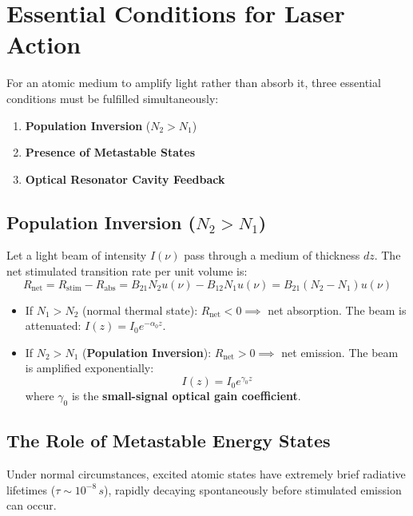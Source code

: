 \section{Essential Conditions for Laser Action}

For an atomic medium to amplify light rather than absorb it, three essential conditions must be fulfilled simultaneously:
\begin{enumerate}
    \item \textbf{Population Inversion} ($N_2 > N_1$)
    \item \textbf{Presence of Metastable States}
    \item \textbf{Optical Resonator Cavity Feedback}
\end{enumerate}

\subsection{Population Inversion (\texorpdfstring{$N_2 > N_1$}{N2 > N1})}
Let a light beam of intensity $I(\nu)$ pass through a medium of thickness $dz$. The net stimulated transition rate per unit volume is:
\begin{equation}
    R_{\text{net}} = R_{\text{stim}} - R_{\text{abs}} = B_{21} N_2 u(\nu) - B_{12} N_1 u(\nu) = B_{21} (N_2 - N_1) u(\nu)
\end{equation}
\begin{itemize}
    \item If $N_1 > N_2$ (normal thermal state): $R_{\text{net}} < 0 \implies$ net absorption. The beam is attenuated: $I(z) = I_0 e^{-\alpha_0 z}$.
    \item If $N_2 > N_1$ (\textbf{Population Inversion}): $R_{\text{net}} > 0 \implies$ net emission. The beam is amplified exponentially:
    \begin{equation}
        I(z) = I_0 e^{\gamma_0 z}
    \end{equation}
    where $\gamma_0$ is the \textbf{small-signal optical gain coefficient}.
\end{itemize}

\subsection{The Role of Metastable Energy States}
Under normal circumstances, excited atomic states have extremely brief radiative lifetimes ($\tau \sim 10^{-8}\,\si{s}$), rapidly decaying spontaneously before stimulated emission can occur.

